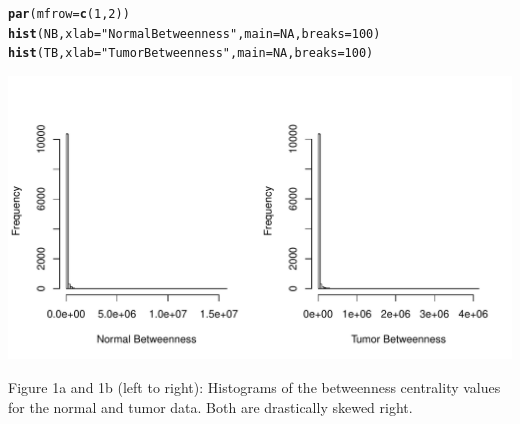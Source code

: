 \documentclass{article}\usepackage[]{graphicx}\usepackage[]{color}
\makeatletter
\def\maxwidth{ %
  \ifdim\Gin@nat@width>\linewidth
    \linewidth
  \else
    \Gin@nat@width
  \fi
}
\newcommand{\hlnum}[1]{\textcolor[rgb]{0.686,0.059,0.569}{#1}}%
\newcommand{\hlstr}[1]{\textcolor[rgb]{0.192,0.494,0.8}{#1}}%
\newcommand{\hlstd}[1]{\textcolor[rgb]{0.345,0.345,0.345}{#1}}%
\newcommand{\hlkwc}[1]{\textcolor[rgb]{0.333,0.667,0.333}{#1}}%
\newcommand{\hlkwd}[1]{\textcolor[rgb]{0.737,0.353,0.396}{\textbf{#1}}}%
\newenvironment{kframe}{%
 \def\at@end@of@kframe{}%
 \ifinner\ifhmode%
  \def\at@end@of@kframe{\end{minipage}}%
  \begin{minipage}{\columnwidth}%
 \fi\fi%
 \def\FrameCommand##1{\hskip\@totalleftmargin \hskip-\fboxsep
 \colorbox{shadecolor}{##1}\hskip-\fboxsep
     \hskip-\linewidth \hskip-\@totalleftmargin \hskip\columnwidth}%
 \MakeFramed {\advance\hsize-\width
   \@totalleftmargin\z@ \linewidth\hsize
   \@setminipage}}%
 {\par\unskip\endMakeFramed%
 \at@end@of@kframe}
\newenvironment{knitrout}{}{} %
\makeatother
\begin{document}
\begin{knitrout}\small
{}\color{fgcolor}\begin{kframe}
\begin{alltt}
\hlkwd{par}\hlstd{(}\hlkwc{mfrow}\hlstd{=}\hlkwd{c}\hlstd{(}\hlnum{1}\hlstd{,}\hlnum{2}\hlstd{))}
\hlkwd{hist}\hlstd{(NB,} \hlkwc{xlab} \hlstd{=} \hlstr{"Normal Betweenness"}\hlstd{,} \hlkwc{main} \hlstd{=} \hlnum{NA}\hlstd{,} \hlkwc{breaks} \hlstd{=} \hlnum{100}\hlstd{)}
\hlkwd{hist}\hlstd{(TB,} \hlkwc{xlab} \hlstd{=} \hlstr{"Tumor Betweenness"}\hlstd{,} \hlkwc{main} \hlstd{=} \hlnum{NA}\hlstd{,} \hlkwc{breaks} \hlstd{=} \hlnum{100}\hlstd{)}
\end{alltt}
\end{kframe}
\includegraphics[width=\maxwidth]{figure/unnamed-chunk-9-1} 

\end{knitrout}

\begin{center}
\small{Figure 1a and 1b (left to right): Histograms of the betweenness centrality values for the normal and tumor data. Both are drastically skewed right.}
\end{center}
\end{document}
